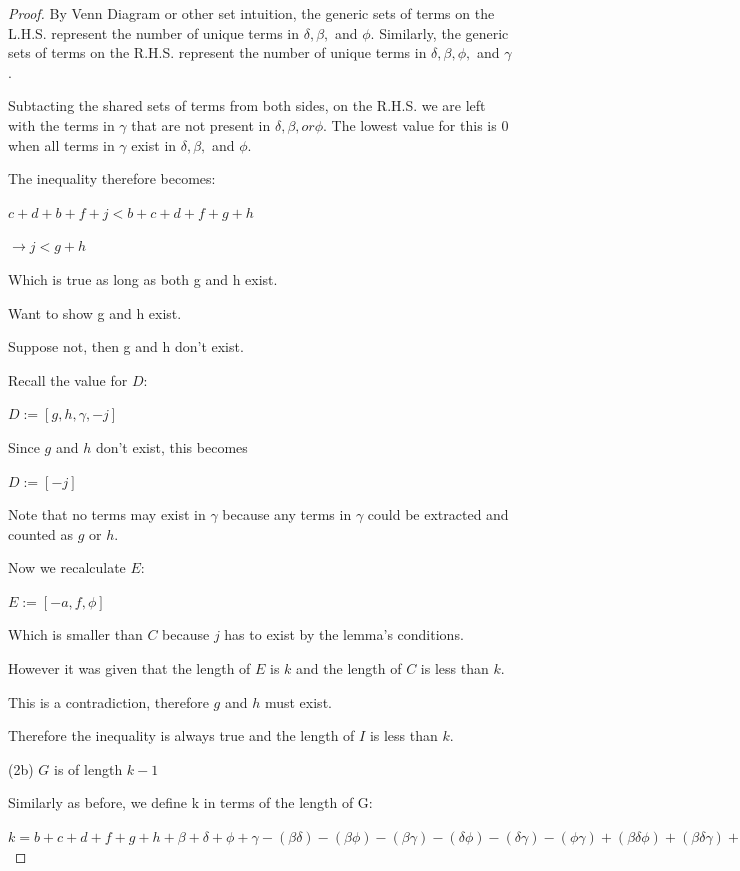 \documentclass[manuscript]{acmart}
\begin{document}
\begin{proof}
        By Venn Diagram or other set intuition, 
        the generic sets of terms on the L.H.S. represent the number 
        of unique terms in $\delta, \beta,$ and $\phi$. Similarly, 
        the generic sets of terms on the R.H.S. represent the number
        of unique terms in $\delta, \beta, \phi,$ and $\gamma$.

        Subtacting the shared sets of terms from both sides, on
        the R.H.S. we are left
        with the terms in $\gamma$ that are not present in 
        $\delta, \beta, or \phi$. The lowest value for this is 0 when
        all terms in $\gamma$ exist in $\delta, \beta,$ and $\phi$.

        The inequality therefore becomes:

        $c + d + b + f + j < b + c + d + f + g + h$

        $\rightarrow j < g + h$

        Which is true as long as both g and h exist.

        Want to show g and h exist.

        Suppose not, then g and h don't exist.

        Recall the value for $D$:

        $D := [g, h, \gamma, -j]$

        Since $g$ and $h$ don't exist, this becomes

        $D := [-j]$

        Note that no terms may exist in $\gamma$ because any terms in $\gamma$
        could be extracted and counted as $g$ or $h$.

        Now we recalculate $E$:

        $E := [-a, f, \phi]$

        Which is smaller than $C$ because $j$ has to exist by the lemma's conditions.

        However it was given that the length of $E$ is $k$ and the length of $C$
        is less than $k$.

        This is a contradiction, therefore $g$ and $h$ must exist.

        Therefore the inequality is always true and the length of $I$ is less than $k$.

        (2b) $G$ is of length $k - 1$

        Similarly as before, we define k in terms of the length of G:

        $k = b + c + d + f + g + h
            + \beta + \delta + \phi + \gamma
            - (\beta \delta) - (\beta \phi) - (\beta \gamma) - (\delta \phi) - (\delta \gamma) -(\phi \gamma)
            + (\beta \delta \phi) + (\beta \delta \gamma) + (\beta \phi \gamma) + (\delta \phi \gamma)
            - (\beta \delta \phi \gamma)
            + 1
        $


\end{proof}
\end{document}
